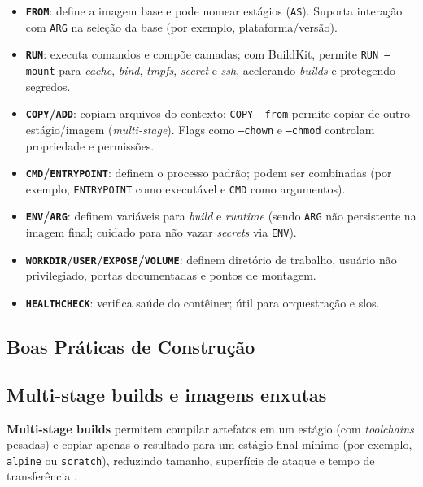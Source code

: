 \begin{itemize}
    \item \textbf{\texttt{FROM}}: define a imagem base e pode nomear estágios (\texttt{AS}). Suporta interação com \texttt{ARG} na seleção da base (por exemplo, plataforma/versão). \cite{dockerfile_ref} 
    
    \item \textbf{\texttt{RUN}}: executa comandos e compõe camadas; com BuildKit, permite \texttt{RUN --mount} para \textit{cache}, \textit{bind}, \textit{tmpfs}, \textit{secret} e \textit{ssh}, acelerando \textit{builds} e protegendo segredos. \cite{dockerfile_ref} 
    \item \textbf{\texttt{COPY}/\texttt{ADD}}: copiam arquivos do contexto; \texttt{COPY --from} permite copiar de outro estágio/imagem (\textit{multi-stage}). Flags como \texttt{--chown} e \texttt{--chmod} controlam propriedade e permissões. \cite{dockerfile_ref}
    \item \textbf{\texttt{CMD}/\texttt{ENTRYPOINT}}: definem o processo padrão; podem ser combinadas (por exemplo, \texttt{ENTRYPOINT} como executável e \texttt{CMD} como argumentos). \cite{dockerfile_ref}
    \item \textbf{\texttt{ENV}/\texttt{ARG}}: definem variáveis para \textit{build} e \textit{runtime} (sendo \texttt{ARG} não persistente na imagem final; cuidado para não vazar \textit{secrets} via \texttt{ENV}). \cite{dockerfile_ref}
    \item \textbf{\texttt{WORKDIR}/\texttt{USER}/\texttt{EXPOSE}/\texttt{VOLUME}}: definem diretório de trabalho, usuário não privilegiado, portas documentadas e pontos de montagem. \cite{dockerfile_ref}
    \item \textbf{\texttt{HEALTHCHECK}}: verifica saúde do contêiner; útil para orquestração e \acrshort{slo}s. \cite{dockerfile_ref}
\end{itemize}

\subsection{Boas Práticas de Construção}
\label{sec:docker-best-practices}

\subsection{Multi-stage builds e imagens enxutas}
\label{subsec:multi-stage}

\textbf{Multi-stage builds} permitem compilar artefatos em um estágio (com \textit{toolchains} pesadas) e copiar apenas o resultado para um estágio final mínimo (por exemplo, \texttt{alpine} ou \texttt{scratch}), reduzindo tamanho, superfície de ataque e tempo de transferência \cite{dockerfile_ref}.

